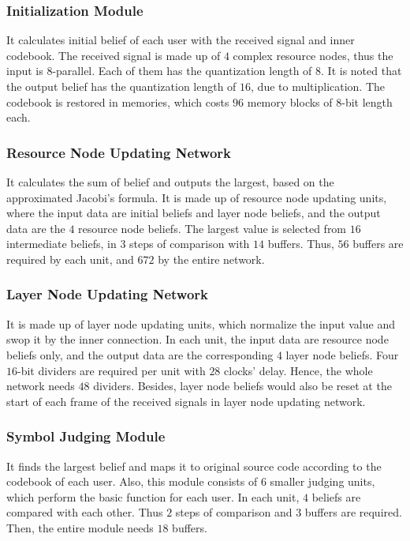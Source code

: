 \documentclass[journal,twoside]{IEEEtran}
\begin{document}
\subsubsection{Initialization Module}\label{sec:subsub:IM}
It calculates initial belief of each user with the received signal and inner codebook. The received signal is made up of $4$ complex resource nodes, thus the input is $8$-parallel. Each of them has the quantization length of $8$. It is noted that the output belief has the quantization length of $16$, due to multiplication. The codebook is restored in memories, which costs $96$ memory blocks of $8$-bit length each.

\subsubsection{Resource Node Updating Network}\label{sec:subsub:rnun}
It calculates the sum of belief and outputs the largest, based on the approximated Jacobi's formula. It is made up of resource node updating units, where the input data are initial beliefs and layer node beliefs, and the output data are the $4$ resource node beliefs. The largest value is selected from $16$ intermediate beliefs, in $3$ steps of comparison with $14$ buffers. Thus, $56$ buffers are required by each unit, and $672$ by the entire network.

\subsubsection{Layer Node Updating Network}\label{sec:subsub:lnun}
It is made up of layer node updating units,
which normalize the input value and swop it by the inner connection. In each unit, the input data are resource node beliefs only, and the output data are the corresponding $4$ layer node beliefs. Four $16$-bit dividers are required per unit with $28$ clocks' delay. Hence, the whole network needs $48$ dividers. Besides, layer node beliefs would also be reset at the start of each frame of the received signals in layer node updating network.

\subsubsection{Symbol Judging Module}\label{sec:subsub:sjm}
It finds the largest belief and maps it to original source code according to the codebook of each user. Also, this module consists of $6$ smaller judging units, which perform the basic function for each user. In each unit, $4$ beliefs are compared with each other. Thus $2$ steps of comparison and $3$ buffers are required. Then, the entire module needs $18$ buffers.
\end{document}
